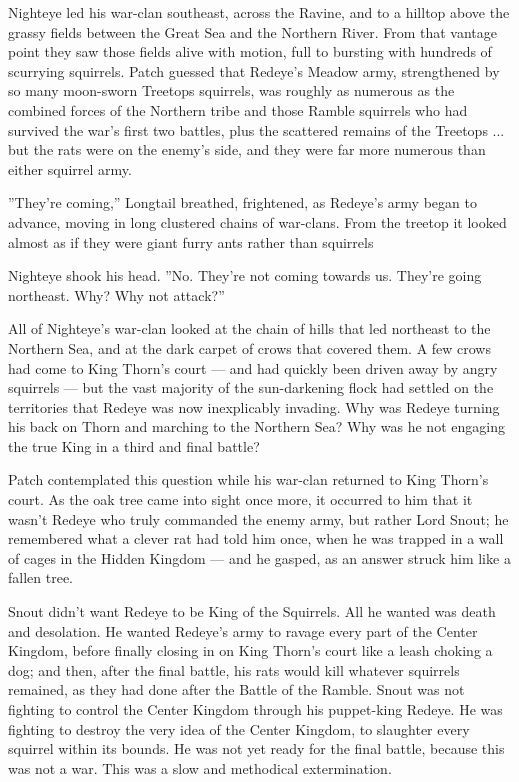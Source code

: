 \documentclass[12pt]{book}
\begin{document}
Nighteye led his war-clan southeast, across the Ravine, and to a hilltop above the grassy fields between the Great Sea and the Northern River. From that vantage point they saw those fields alive with motion, full to bursting with hundreds of scurrying squirrels. Patch guessed that Redeye's Meadow army, strengthened by so many moon-sworn Treetops squirrels, was roughly as numerous as the combined forces of the Northern tribe and those Ramble squirrels who had survived the war's first two battles, plus the scattered remains of the Treetops ... but the rats were on the enemy's side, and they were far more numerous than either squirrel army.

''They're coming,'' Longtail breathed, frightened, as Redeye's army began to advance, moving in long clustered chains of war-clans. From the treetop it looked almost as if they were giant furry ants rather than squirrels

Nighteye shook his head. ''No. They're not coming towards us. They're going northeast. Why? Why not attack?''

All of Nighteye's war-clan looked at the chain of hills that led northeast to the Northern Sea, and at the dark carpet of crows that covered them. A few crows had come to King Thorn's court ---
and had quickly been driven away by angry squirrels ---
but the vast majority of the sun-darkening flock had settled on the territories that Redeye was now inexplicably invading. Why was Redeye turning his back on Thorn and marching to the Northern Sea? Why was he not engaging the true King in a third and final battle?

Patch contemplated this question while his war-clan returned to King Thorn's court. As the oak tree came into sight once more, it occurred to him that it wasn't Redeye who truly commanded the enemy army, but rather Lord Snout; he remembered what a clever rat had told him once, when he was trapped in a wall of cages in the Hidden Kingdom ---
and he gasped, as an answer struck him like a fallen tree.

Snout didn't want Redeye to be King of the Squirrels. All he wanted was death and desolation. He wanted Redeye's army to ravage every part of the Center Kingdom, before finally closing in on King Thorn's court like a leash choking a dog; and then, after the final battle, his rats would kill whatever squirrels remained, as they had done after the Battle of the Ramble. Snout was not fighting to control the Center Kingdom through his puppet-king Redeye. He was fighting to destroy the very idea of the Center Kingdom, to slaughter every squirrel within its bounds. He was not yet ready for the final battle, because this was not a war. This was a slow and methodical extermination.
\end{document}
